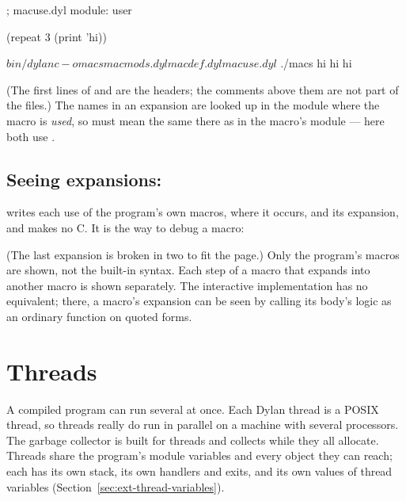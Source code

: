 \begin{dylan}
; macuse.dyl
module: user

(repeat 3 (print 'hi))
\end{dylan}

\begin{shell}
$ bin/dylanc -o macs macmods.dyl macdef.dyl macuse.dyl
$ ./macs
hi
hi
hi
\end{shell}

(The first lines of  and  are the
 headers; the comments above them are not part of the
files.) The names in an expansion are looked up in the module where the
macro is \emph{used}, so  must mean the same there as in
the macro's module --- here both use .

\subsection{Seeing expansions: }\label{sec:ext-expand}

 writes each use of the program's own macros, where it
occurs, and its expansion, and makes no C. It is the way to debug a
macro:


\noindent (The last expansion is broken in two to fit the page.) Only the
program's macros are shown, not the built-in syntax. Each step
of a macro that expands into another macro is shown separately. The
interactive implementation has no equivalent; there, a macro's expansion
can be seen by calling its body's logic as an ordinary function on quoted
forms.

\section{Threads}\label{sec:ext-threads}

A compiled program can run several  at once. Each Dylan
thread is a POSIX thread, so threads really do run in parallel on a
machine with several processors. The garbage collector is built for
threads and collects while they all allocate. Threads share the
program's module variables and every object they can reach; each has
its own stack, its own handlers and exits, and its own values of thread
variables (Section~\ref{sec:ext-thread-variables}).

